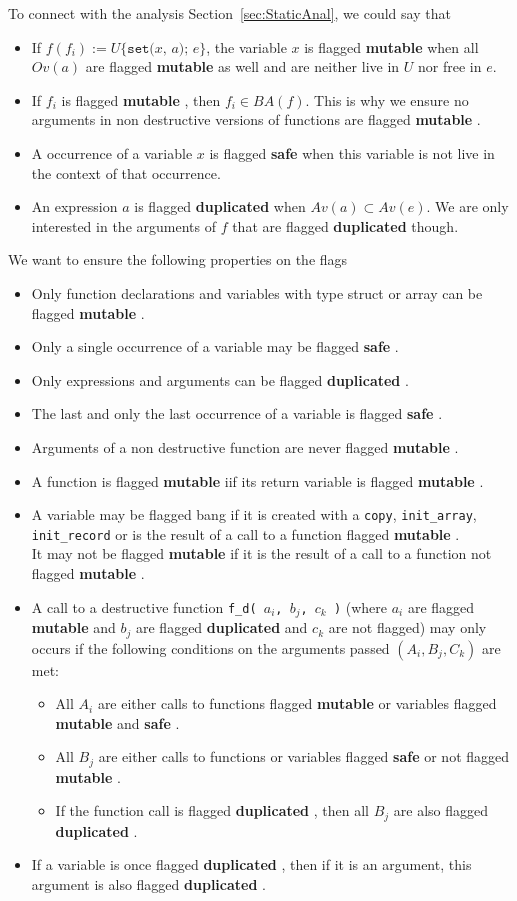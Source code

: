 \documentclass[12pt,a4paper]{article}
\newcommand{\cl}[1]{\texttt{#1}}
\newcommand{\bang}{ \textbf{ mutable } }
\newcommand{\safe}{ \textbf{ safe } }
\newcommand{\dupl}{ \textbf{ duplicated } }
\newcommand{\ucont}[1]{\{#1\}}
\begin{document}
To connect with the analysis Section~\ref{sec:StaticAnal}, we could say that
\begin{itemize}
\item If $f(f_i) := U\ucont{\cl{set(}x\cl{, }a\cl{); }e}$, the variable $x$ is flagged \bang when all $Ov(a)$ are flagged \bang as well and are neither live in $U$ nor free in $e$.
\item If $f_i$ is flagged \bang, then $f_i \in BA(f)$. This is why we ensure no arguments in non destructive versions of functions are flagged \bang.
\item A occurrence of a variable $x$ is flagged \safe when this variable is not live in the context of that occurrence.
\item An expression $a$ is flagged \dupl when $Av(a) \subset Av(e)$. We are only interested in the arguments of $f$ that are flagged \dupl though.
\end{itemize}

We want to ensure the following properties on the flags
\begin{itemize}
\item Only function declarations and variables with type struct or array can be flagged \bang.
\item Only a single occurrence of a variable may be flagged \safe.
\item Only expressions and arguments can be flagged \dupl.
\item The last and only the last occurrence of a variable is flagged \safe.
\item Arguments of a non destructive function are never flagged \bang.
\item A function is flagged \bang iif its return variable is flagged \bang.
\item A variable may be flagged bang if it is created with a \cl{copy}, \cl{init\_array}, \cl{init\_record} or is the result of a call to a function flagged \bang.\\
It may not be flagged \bang if it is the result of a call to a function not flagged \bang.
\item A call to a destructive function \cl{f\_d( $a_i$, $b_j$, $c_k$ )} (where $a_i$ are flagged \bang and $b_j$ are flagged \dupl and $c_k$ are not flagged) may only occurs if the following conditions on the arguments passed $( A_i, B_j, C_k )$ are met:
\begin{itemize}
\item All $A_i$ are either calls to functions flagged \bang or variables flagged \bang and \safe.
\item All $B_j$ are either calls to functions or variables flagged \safe or not flagged \bang.
\item If the function call is flagged \dupl, then all $B_j$ are also flagged \dupl.
\end{itemize}
\item If a variable is once flagged \dupl, then if it is an argument, this argument is also flagged \dupl.
\end{itemize}
\end{document}
